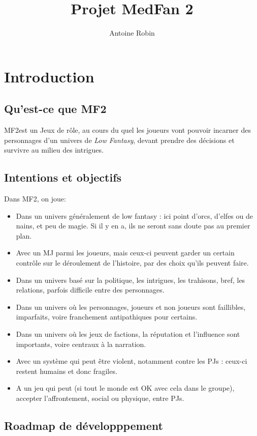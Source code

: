 \documentclass[10pt,a4paper]{book}
\author{ Antoine Robin}
\title{Projet MedFan 2}
\newcommand{\titre}{MF2}
\begin{document}
\maketitle
\tableofcontents
\chapter*{Introduction}

\section*{Qu'est-ce que \titre}
\titre est un Jeux de rôle, au cours du quel les joueurs vont pouvoir incarner des personnages d'un univers de \emph{Low Fantasy}, devant prendre des décisions et survivre au milieu des intrigues.
\section*{Intentions et objectifs}
Dans \titre, on joue:
\begin{itemize}
\item Dans un univers généralement de low fantasy : ici point d'orcs, d'elfes ou de nains, et peu de magie. Si il y en a, ils ne seront sans doute pas au premier plan.
\item Avec un MJ parmi les joueurs, mais ceux-ci peuvent garder un certain contrôle sur le déroulement de l'histoire, par des choix qu'ils peuvent faire.
\item Dans un univers basé sur la politique, les intrigues, les trahisons, bref, les relations, parfois difficile entre des personnages.
\item Dans un univers où les personnages, joueurs et non joueurs sont faillibles, imparfaits, voire franchement antipathiques pour certains.
\item Dans un univers où les jeux de factions, la réputation et l'influence sont importants, voire centraux à la narration.
\item Avec un système qui peut être violent, notamment contre les PJs : ceux-ci restent humains et donc fragiles.
\item A un jeu qui peut (si tout le monde est OK avec cela dans le groupe), accepter l'affrontement, social ou physique, entre PJs.
\end{itemize}
\section*{Roadmap de développpement}
\end{document}
